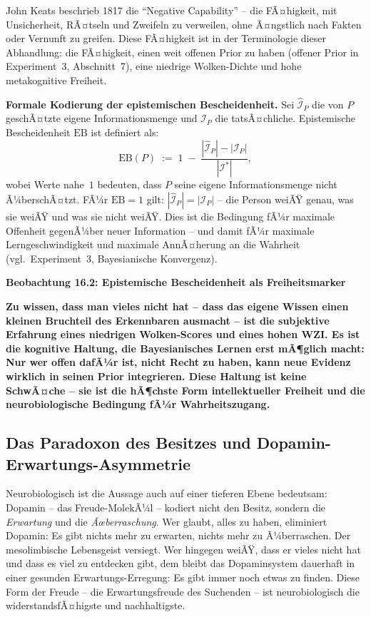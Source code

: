 ﻿\documentclass[12pt,a4paper]{report}
\theoremstyle{plain}
\theoremstyle{definition}
\theoremstyle{remark}
\begin{document}
	John Keats beschrieb 1817 die ``Negative Capability'' --
	die FÃ¤higkeit, mit Unsicherheit, RÃ¤tseln und Zweifeln
	zu verweilen, ohne Ã¤ngstlich nach Fakten oder Vernunft zu greifen.
	Diese FÃ¤higkeit ist in der Terminologie dieser Abhandlung:
	die FÃ¤higkeit, einen weit offenen Prior zu haben
	(offener Prior in Experiment~3, Abschnitt~7),
	eine niedrige Wolken-Dichte und hohe metakognitive Freiheit.

	\textbf{Formale Kodierung der epistemischen Bescheidenheit.}
	Sei $\hat{\mathcal{I}}_P$ die von $P$ geschÃ¤tzte eigene
	Informationsmenge und $\mathcal{I}_P$ die tatsÃ¤chliche.
	Epistemische Bescheidenheit $\mathrm{EB}$ ist definiert als:
	\[
	\mathrm{EB}(P)
	\;:=\; 1 \;-\;
	\frac{|\hat{\mathcal{I}}_P| - |\mathcal{I}_P|}{|\mathcal{I}^*|},
	\]
	wobei Werte nahe~$1$ bedeuten, dass $P$ seine eigene
	Informationsmenge nicht Ã¼berschÃ¤tzt.
	FÃ¼r $\mathrm{EB} = 1$ gilt: $|\hat{\mathcal{I}}_P| = |\mathcal{I}_P|$ --
	die Person weiÃŸ genau, was sie weiÃŸ und was sie nicht weiÃŸ.
	Dies ist die Bedingung fÃ¼r maximale Offenheit gegenÃ¼ber neuer
	Information -- und damit fÃ¼r maximale Lerngeschwindigkeit und
	maximale AnnÃ¤herung an die Wahrheit (vgl.\ Experiment~3,
	Bayesianische Konvergenz).

	
	\noindent\textbf{Beobachtung 16.2: Epistemische Bescheidenheit als Freiheitsmarker}

		\textbf{Zu wissen, dass man vieles nicht hat -- dass das eigene
		Wissen einen kleinen Bruchteil des Erkennbaren ausmacht --
		ist die subjektive Erfahrung eines niedrigen Wolken-Scores
		und eines hohen WZI. Es ist die kognitive Haltung, die
		Bayesianisches Lernen erst mÃ¶glich macht:
		Nur wer offen dafÃ¼r ist, nicht Recht zu haben,
		kann neue Evidenz wirklich in seinen Prior integrieren.
		Diese Haltung ist keine SchwÃ¤che -- sie ist die hÃ¶chste Form
		intellektueller Freiheit und die neurobiologische Bedingung
		fÃ¼r Wahrheitszugang.}


	\subsection{Das Paradoxon des Besitzes und Dopamin-Erwartungs-Asymmetrie}

	Neurobiologisch ist die Aussage auch auf einer tieferen Ebene bedeutsam:
	Dopamin -- das Freude-MolekÃ¼l -- kodiert nicht den Besitz,
	sondern die \emph{Erwartung} und die \emph{Ãœberraschung}.
	Wer glaubt, alles zu haben, eliminiert Dopamin:
	Es gibt nichts mehr zu erwarten, nichts mehr zu Ã¼berraschen.
	Der mesolimbische Lebensgeist versiegt.
	Wer hingegen weiÃŸ, dass er vieles nicht hat und dass es viel zu entdecken
	gibt, dem bleibt das Dopaminsystem dauerhaft in einer gesunden
	Erwartungs-Erregung: Es gibt immer noch etwas zu finden.
	Diese Form der Freude -- die Erwartungsfreude des Suchenden --
	ist neurobiologisch die widerstandsfÃ¤higste und nachhaltigste.
\end{document}
